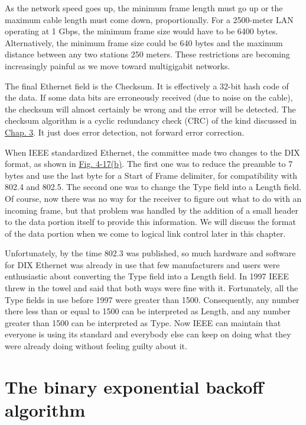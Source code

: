 As the network speed goes up, the minimum frame length must go up or the
maximum cable length must come down, proportionally. For a 2500-meter
LAN operating at 1 Gbps, the minimum frame size would have to be 6400
bytes. Alternatively, the minimum frame size could be 640 bytes and the
maximum distance between any two stations 250 meters. These restrictions
are becoming increasingly painful as we move toward multigigabit
networks.

The final Ethernet field is the {Checksum}. It is effectively a 32-bit
hash code of the data. If some data bits are erroneously received (due
to noise on the cable), the checksum will almost certainly be wrong and
the error will be detected. The checksum algorithm is a cyclic
redundancy check (CRC) of the kind discussed in
\protect\hyperlink{0130661023_ch03.htmlux5cux23ch03}{Chap. 3}. It just
does error detection, not forward error correction.

When IEEE standardized Ethernet, the committee made two changes to the
DIX format, as shown in
\protect\hyperlink{0130661023_ch04lev1sec3.htmlux5cux23ch04fig17}{Fig.
4-17(b)}. The first one was to reduce the preamble to 7 bytes and use
the last byte for a {Start of Frame} delimiter, for compatibility with
802.4 and 802.5. The second one was to change the {Type} field into a
{Length} field. Of course, now there was no way for the receiver to
figure out what to do with an incoming frame, but that problem was
handled by the addition of a small header to the data portion itself to
provide this information. We will discuss the format of the data portion
when we come to logical link control later in this chapter.

Unfortunately, by the time 802.3 was published, so much hardware and
software for DIX Ethernet was already in use that few manufacturers and
users were enthusiastic about converting the {Type} field into a
{Length} field. In 1997 IEEE threw in the towel and said that both ways
were fine with it. Fortunately, all the {Type} fields in use before 1997
were greater than 1500. Consequently, any number there less than or
equal to 1500 can be interpreted as {Length}, and any number greater
than 1500 can be interpreted as {Type}. Now IEEE can maintain that
everyone is using its standard and everybody else can keep on doing what
they were already doing without feeling guilty about it.

\protect\hypertarget{0130661023_ch04lev1sec3.htmlux5cux23ch04lev2sec12}{}{}

\section{The binary exponential backoff algorithm}

